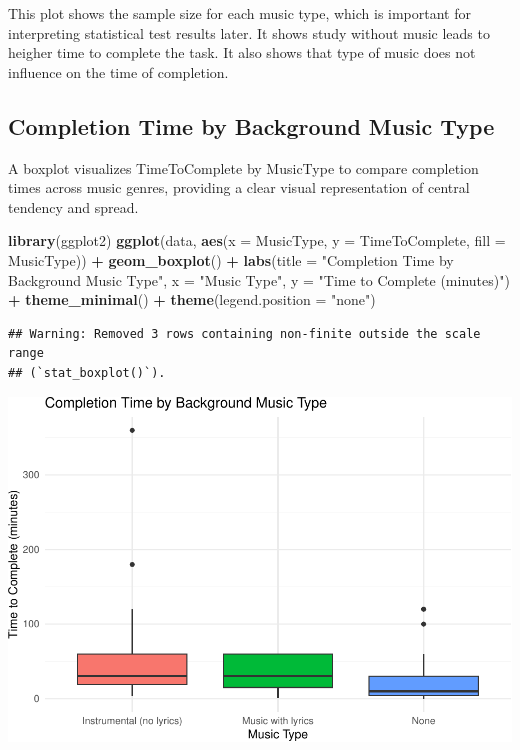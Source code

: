 \documentclass[
]{article}
\newenvironment{Shaded}{\begin{snugshade}}{\end{snugshade}}
\newcommand{\AttributeTok}[1]{\textcolor[rgb]{0.13,0.29,0.53}{#1}}
\newcommand{\FunctionTok}[1]{\textcolor[rgb]{0.13,0.29,0.53}{\textbf{#1}}}
\newcommand{\NormalTok}[1]{#1}
\newcommand{\SpecialCharTok}[1]{\textcolor[rgb]{0.81,0.36,0.00}{\textbf{#1}}}
\newcommand{\StringTok}[1]{\textcolor[rgb]{0.31,0.60,0.02}{#1}}
\begin{document}
This plot shows the sample size for each music type, which is important
for interpreting statistical test results later. It shows study without
music leads to heigher time to complete the task. It also shows that
type of music does not influence on the time of completion.

\subsection{Completion Time by Background Music
Type}\label{completion-time-by-background-music-type}

A boxplot visualizes TimeToComplete by MusicType to compare completion
times across music genres, providing a clear visual representation of
central tendency and spread.

\begin{Shaded}
\begin{Highlighting}[]
\FunctionTok{library}\NormalTok{(ggplot2)}
\FunctionTok{ggplot}\NormalTok{(data, }\FunctionTok{aes}\NormalTok{(}\AttributeTok{x =}\NormalTok{ MusicType, }\AttributeTok{y =}\NormalTok{ TimeToComplete, }\AttributeTok{fill =}\NormalTok{ MusicType)) }\SpecialCharTok{+}
  \FunctionTok{geom\_boxplot}\NormalTok{() }\SpecialCharTok{+}
  \FunctionTok{labs}\NormalTok{(}\AttributeTok{title =} \StringTok{"Completion Time by Background Music Type"}\NormalTok{,}
       \AttributeTok{x =} \StringTok{"Music Type"}\NormalTok{,}
       \AttributeTok{y =} \StringTok{"Time to Complete (minutes)"}\NormalTok{) }\SpecialCharTok{+}
  \FunctionTok{theme\_minimal}\NormalTok{() }\SpecialCharTok{+}
  \FunctionTok{theme}\NormalTok{(}\AttributeTok{legend.position =} \StringTok{"none"}\NormalTok{)}
\end{Highlighting}
\end{Shaded}

\begin{verbatim}
## Warning: Removed 3 rows containing non-finite outside the scale range
## (`stat_boxplot()`).
\end{verbatim}

\includegraphics{Assignment2_files/figure-latex/unnamed-chunk-2-1.pdf}
\end{document}
